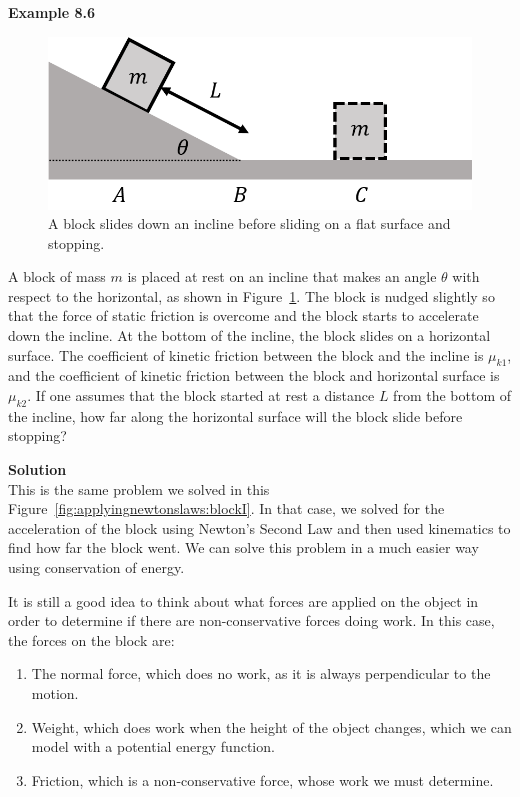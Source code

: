 \begin{framed}
\textbf{Example 8.6}\\
\begin{figure}[!htbp]
\centering
\includegraphics[width=0.5\linewidth]{files/blockI-932a28c0a09a5e6695d86a4eee39dcf0.png}
\caption[]{A block slides down an incline before sliding on a flat surface and stopping.}
\label{fig:potentialecons:blockI}
\end{figure}

A block of mass $m$ is placed at rest on an incline that makes an angle $\theta$ with respect to the horizontal, as shown in Figure~\ref{fig:potentialecons:blockI}. The block is nudged slightly so that the force of static friction is overcome and the block starts to accelerate down the incline. At the bottom of the incline, the block slides on a horizontal surface.
The coefficient of kinetic friction between the block and the incline is $\mu_{k1}$, and the coefficient of kinetic friction between the block and horizontal surface is $\mu_{k2}$. If one assumes that the block started at rest a distance $L$ from the bottom of the incline, how far along the horizontal surface will the block slide before stopping?

\begin{framed}
\textbf{Solution}\\
This is the same problem we solved in this Figure~\ref{fig:applyingnewtonslaws:blockI}. In that case, we solved for the acceleration of the block using Newton's Second Law and then used kinematics to find how far the block went. We can solve this problem in a much easier way using conservation of energy.

It is still a good idea to think about what forces are applied on the object in order to determine if there are non-conservative forces doing work. In this case, the forces on the block are:

\begin{enumerate}
\item The normal force, which does no work, as it is always perpendicular to the motion.
\item Weight, which does work when the height of the object changes, which we can model with a potential energy function.
\item Friction, which is a non-conservative force, whose work we must determine.
\end{enumerate}


\end{framed}
\end{framed}
